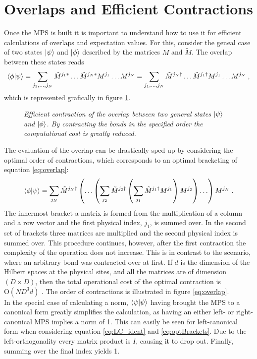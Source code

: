 \section{Overlaps and Efficient Contractions}
Once the MPS is built it is important to understand how to use it for efficient calculations of overlaps and expectation values. For this, consider the geneal case of two states $\ket{\psi}$ and $\ket{\phi}$ described by the matrices $M$ and $\tilde{M}$. The overlap between these states reads
\begin{equation}
	\braket{\phi | \psi} = \sum_{j_1 , \ldots , j_N} \tilde{M}^{j_1 *} \ldots \tilde{M}^{j_N *} M^{j_1} \ldots M^{j_N} = \sum_{j_1 , \ldots , j_N} \tilde{M}^{j_N \dag} \ldots \tilde{M}^{j_1 \dag} M^{j_1} \ldots M^{j_N} \; , 
	\label{eq:overlap}
\end{equation}
which is represented grafically in figure \ref{fig:effCont}.
\begin{figure}[h!]
	\centering
	
	\caption{\textit{Efficient contraction of the overlap between two general states $\ket{\psi}$ and $\ket{\phi}$. By contracting the bonds in the specified order the computational cost is greatly reduced.}}
	\label{fig:effCont}
\end{figure}
The evaluation of the overlap can be drastically sped up by considering the optimal order of contractions, which corresponds to an optimal bracketing of equation \ref{eq:overlap}:
\begin{equation}
	\braket{\phi | \psi} = \sum_{j_N} \tilde{M}^{j_N \dag} \left( \ldots \left( \sum_{j_2} \tilde{M}^{j_2 \dag} \left( \sum_{j_1} \tilde{M}^{j_1 \dag} M^{j_1} \right) M^{j_2} \right) \ldots \right) M^{j_N} \; .
	\label{eq:optBrackets}
\end{equation}  
The innermost bracket a matrix is formed from the multiplication of a column and a row vector and the first physical index, $j_1$, is summed over. In the second set of brackets three matrices are multiplied and the second physical index is summed over. This procedure continues, however, after the first contraction the complexity of the operation does not increase. This is in contrast to the scenario, where an arbitrary bond was contracted over at first. If $d$ is the dimension of the Hilbert spaces at the physical sites, and all the matrices are of dimension $(D \times D)$, then the total operational cost of the optimal contraction is $\mathrm{O}(N D^3 d)$ \cite{Schollwock}. The order of contractions is illustrated in figure \ref{eq:overlap}.\\
In the special case of calculating a norm, $\braket{\psi | \psi}$ having brought the MPS to a canonical form greatly simplifies the calculation, as having an either left- or right-canonical MPS implies a norm of 1. This can easily be seen for left-canonical form when considering equation \ref{eq:LC_ident} and \ref{eq:optBrackets}. Due to the left-orthogonality every matrix product is $I$, causing it to drop out. Finally, summing over the final index yields 1.


